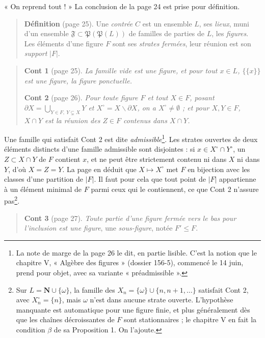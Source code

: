 \documentclass[11pt,a4paper]{article}
\begin{document}
« On reprend tout ! » La conclusion de la page 24 est prise pour définition.

\begin{quote}
\textbf{Définition} (page 25). Une \emph{contrée} $C$ est un ensemble $L$, ses
\emph{lieux}, muni d'un ensemble $\mathfrak{F} \subset
\mathfrak{P}(\mathfrak{P}(L))$ de familles de parties de $L$, les
\emph{figures}. Les éléments d'une figure $F$ sont ses \emph{strates fermées},
leur réunion est son \emph{support} $|F|$.
\end{quote}

\begin{quote}
\textbf{Cont 1} (page 25). \emph{La famille vide est une figure, et pour tout
$x \in L$, $\{\{x\}\}$ est une figure, la figure ponctuelle.}

\textbf{Cont 2} (page 26). \emph{Pour toute figure $F$ et tout $X \in F$,
posant $\partial X = \bigcup_{Y \in F,\ Y \subsetneq X} Y$ et $X^{\circ} = X
\smallsetminus \partial X$, on a $X^{\circ} \neq \emptyset$ ; et pour $X, Y \in
F$, $X \cap Y$ est la réunion des $Z \in F$ contenus dans $X \cap Y$.}
\end{quote}

Une famille qui satisfait Cont 2 est dite \emph{admissible}\footnote{La note de
marge de la page 26 le dit, en partie lisible. C'est la notion que le chapitre
V, « Algèbre des figures » (dossier 156-5), commencé le 14 juin, prend pour
objet, avec sa variante « préadmissible ».}. Les strates ouvertes de deux
éléments distincts d'une famille admissible sont disjointes : si $x \in
X^{\circ} \cap Y^{\circ}$, un $Z \subset X \cap Y$ de $F$ contient $x$, et ne
peut être strictement contenu ni dans $X$ ni dans $Y$, d'où $X = Z = Y$. La
page en déduit que $X \mapsto X^{\circ}$ met $F$ en bijection avec les classes
d'une partition de $|F|$. Il faut pour cela que tout point de $|F|$ appartienne
à un élément minimal de $F$ parmi ceux qui le contiennent, ce que Cont 2
n'assure pas\footnote{Sur $L = \mathbf{N} \cup \{\omega\}$, la famille des
$X_{n} = \{\omega\} \cup \{n, n+1, \ldots\}$ satisfait Cont 2, avec $X_{n}^{\circ}
= \{n\}$, mais $\omega$ n'est dans aucune strate ouverte. L'hypothèse
manquante est automatique pour une figure finie, et plus généralement dès que
les chaînes décroissantes de $F$ sont stationnaires ; le chapitre V en fait la
condition $\beta$ de sa Proposition 1. On l'ajoute.}.

\begin{quote}
\textbf{Cont 3} (page 27). \emph{Toute partie d'une figure fermée vers le bas
pour l'inclusion est une figure}, une \emph{sous-figure}, notée $F' \leq F$.
\end{quote}
\end{document}
